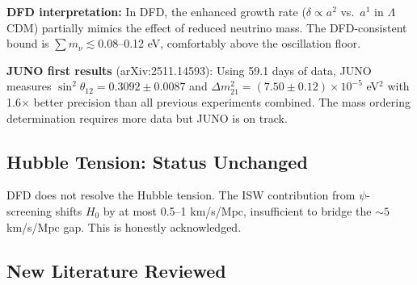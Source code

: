\documentclass[11pt]{article}
\newcommand{\ee}[1]{\times 10^{#1}}
\newcommand{\LCDM}{$\Lambda$CDM}
\begin{document}
\textbf{DFD interpretation:} In DFD, the enhanced growth rate
($\delta \propto a^2$ vs.\ $a^1$ in \LCDM) partially mimics the
effect of reduced neutrino mass. The DFD-consistent bound is
$\sum m_\nu \lesssim 0.08$--0.12 eV, comfortably above the oscillation
floor.

\textbf{JUNO first results} (arXiv:2511.14593): Using 59.1 days of
data, JUNO measures $\sin^2\theta_{12} = 0.3092 \pm 0.0087$ and
$\Delta m^2_{21} = (7.50 \pm 0.12)\ee{-5}$ eV$^2$ with 1.6$\times$
better precision than all previous experiments combined. The mass
ordering determination requires more data but JUNO is on track.

\subsection{Hubble Tension: Status Unchanged}

DFD does not resolve the Hubble tension. The ISW contribution from
$\psi$-screening shifts $H_0$ by at most 0.5--1 km/s/Mpc, insufficient
to bridge the $\sim 5$ km/s/Mpc gap. This is honestly acknowledged.

\subsection{New Literature Reviewed}
\end{document}

